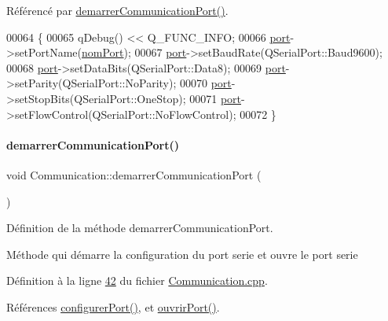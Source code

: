 Référencé par \hyperlink{_communication_8cpp_source_l00042}{demarrer\+Communication\+Port()}.


\begin{DoxyCode}
00064 \{
00065     qDebug() << Q\_FUNC\_INFO;
00066     \hyperlink{class_communication_aff7d55208f31232fbdc1dcec488908f1}{port}->setPortName(\hyperlink{class_communication_a5fa89ee1fc732871f3f8f177fb50bf2a}{nomPort});
00067     \hyperlink{class_communication_aff7d55208f31232fbdc1dcec488908f1}{port}->setBaudRate(QSerialPort::Baud9600);
00068     \hyperlink{class_communication_aff7d55208f31232fbdc1dcec488908f1}{port}->setDataBits(QSerialPort::Data8);
00069     \hyperlink{class_communication_aff7d55208f31232fbdc1dcec488908f1}{port}->setParity(QSerialPort::NoParity);
00070     \hyperlink{class_communication_aff7d55208f31232fbdc1dcec488908f1}{port}->setStopBits(QSerialPort::OneStop);
00071     \hyperlink{class_communication_aff7d55208f31232fbdc1dcec488908f1}{port}->setFlowControl(QSerialPort::NoFlowControl);
00072 \}
\end{DoxyCode}
\mbox{\label{class_communication_a8fe8d15efd2590a1061a015f5f761924}} 
\paragraph{\texorpdfstring{demarrer\+Communication\+Port()}{demarrerCommunicationPort()}}
{\footnotesize\ttfamily void Communication\+::demarrer\+Communication\+Port (\begin{DoxyParamCaption}{ }\end{DoxyParamCaption})}



Définition de la méthode demarrer\+Communication\+Port. 

Méthode qui démarre la configuration du port serie et ouvre le port serie 

Définition à la ligne \hyperlink{_communication_8cpp_source_l00042}{42} du fichier \hyperlink{_communication_8cpp_source}{Communication.\+cpp}.



Références \hyperlink{_communication_8cpp_source_l00063}{configurer\+Port()}, et \hyperlink{_communication_8cpp_source_l00078}{ouvrir\+Port()}.



